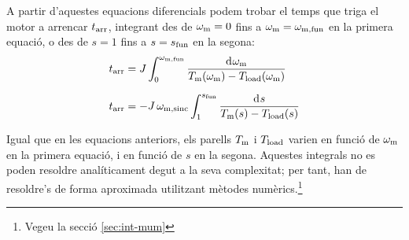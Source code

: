 A partir d'aquestes equacions diferencials podem trobar el temps que triga el motor a arrencar $t_\mathrm{arr}$, integrant des de $\omega_\mathrm{m}=0$ fins a $\omega_\mathrm{m}=\omega_\mathrm{m,fun}$ en la primera equació, o des de $s = 1$ fins a $s = s_\mathrm{fun}$ en la segona:
\begin{subequations}
\begin{align}
    t\ped{arr} &= J\int_{0}^{\omega\ped{m,fun}} \frac{\diff\omega\ped{m}}{T\ped{m}(\omega\ped{m})-T\ped{load}(\omega\ped{m})}\label{eq:tarr-mot}\\[1.5ex]
    t\ped{arr} &= - J\,\omega\ped{m,sinc} \int_{1}^{s\ped{fun}} \frac{\diff s}{T\ped{m}(s)-T\ped{load}(s)}
\end{align}
\end{subequations}

Igual que en les equacions anteriors, els parells $T_\mathrm{m}$ i $T_\mathrm{load}$ varien en funció de $\omega_\mathrm{m}$ en la primera equació, i en funció de $s$ en la segona. Aquestes integrals no es poden  resoldre  analíticament degut a la seva complexitat; per tant,  han de resoldre's de forma aproximada utilitzant mètodes numèrics.\footnote{Vegeu la secció \ref{sec:int-mum}}


